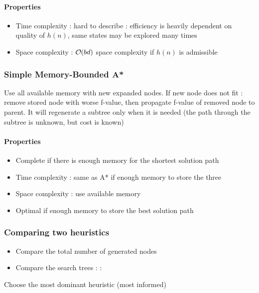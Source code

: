 \paragraph{Properties}
\begin{itemize}
\item Time complexity : hard to describe : efficiency is heavily dependent on quality of $h(n)$, same states may be explored many times
\item Space complexity : $\bigO (bd)$ space complexity if $h(n)$ is admissible
\end{itemize}

\newpage
\subsubsection{Simple Memory-Bounded A*}

Use all available memory with new expanded nodes. If new node does not fit : remove stored node with worse f-value, then propagate f-value of removed node to parent. It will regenerate a subtree only when it is needed (the path through the subtree is unknown, but cost is known)

\paragraph{Properties}
\begin{itemize}
\item Complete if there is enough memory for the shortest solution path
\item Time complexity : same as A* if enough memory to store the three
\item Space complexity : use available memory
\item Optimal if enough memory to store the best solution path
\end{itemize}

\subsubsection{Comparing two heuristics}

\begin{itemize}
\item Compare the total number of generated nodes 
\item Compare the search trees :  : 
\end{itemize}

Choose the most dominant heuristic (most informed)

